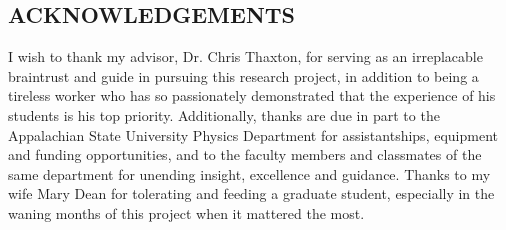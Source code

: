 

\doublespacing
\vspace{11mm}
\begin{center}
\section{ACKNOWLEDGEMENTS}
\end{center}
I wish to thank my advisor, Dr. Chris Thaxton, for serving as an irreplacable braintrust and guide in pursuing this research project, in addition to being a tireless worker who has so passionately demonstrated that the experience of his students is his top priority. Additionally, thanks are due in part to the Appalachian State University Physics Department for assistantships, equipment and funding opportunities, and to the faculty members and classmates of the same department for unending insight, excellence and guidance. Thanks to my wife Mary Dean for tolerating and feeding a graduate student, especially in the waning months of this project when it mattered the most. 

